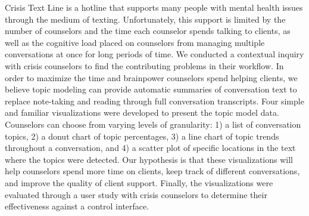 % 
% 
%

Crisis Text Line is a hotline that supports many people with mental health issues
through the medium of texting. Unfortunately, this support is limited by the number
of counselors and the time each counselor spends talking to clients, as well as the
cognitive load placed on counselors from managing multiple conversations at once
for long periods of time. We conducted a contextual inquiry with crisis counselors
to find the contributing problems in their workflow. In order to maximize the time
and brainpower counselors spend helping clients, we believe topic modeling can
provide automatic summaries of conversation text to replace note-taking and reading
through full conversation transcripts. Four simple and familiar visualizations were
developed to present the topic model data. Counselors can choose from varying levels
of granularity: 1) a list of conversation topics, 2) a donut chart of topic percentages,
3) a line chart of topic trends throughout a conversation, and 4) a scatter plot of
specific locations in the text where the topics were detected. Our hypothesis is that
these visualizations will help counselors spend more time on clients, keep track of
different conversations, and improve the quality of client support. Finally, the
visualizations were evaluated through a user study with crisis counselors to determine their
effectiveness against a control interface.
